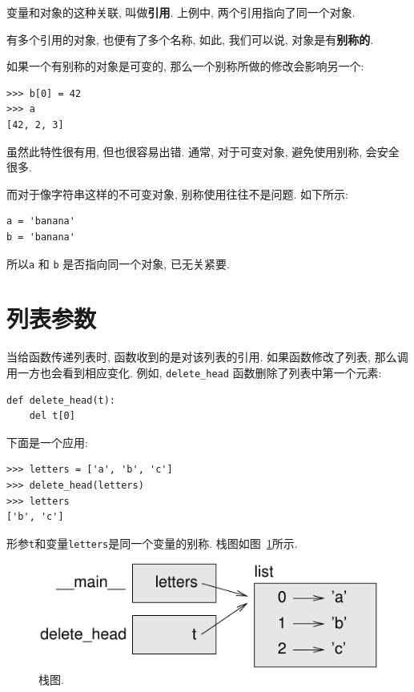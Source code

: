 \documentclass[10pt]{book}
\begin{document}
变量和对象的这种关联, 叫做{\bf 引用}.
上例中, 两个引用指向了同一个对象. 

有多个引用的对象, 也便有了多个名称, 
如此, 我们可以说, 对象是有{\bf 别称的}.

如果一个有别称的对象是可变的, 那么一个别称所做的修改会影响另一个:

\begin{verbatim}
>>> b[0] = 42
>>> a
[42, 2, 3]
\end{verbatim}
%

虽然此特性很有用, 但也很容易出错. 
通常, 对于可变对象, 避免使用别称, 会安全很多. 

而对于像字符串这样的不可变对象, 别称使用往往不是问题. 
如下所示:

\begin{verbatim}
a = 'banana'
b = 'banana'
\end{verbatim}
%
所以{\tt a} 和 {\tt b} 是否指向同一个对象, 已无关紧要. 


\section{列表参数}
\label{list.arguments}

当给函数传递列表时, 函数收到的是对该列表的引用. 
如果函数修改了列表, 那么调用一方也会看到相应变化. 
例如, \verb"delete_head" 函数删除了列表中第一个元素:

\begin{verbatim}
def delete_head(t):
    del t[0]
\end{verbatim}
%

下面是一个应用:

\begin{verbatim}
>>> letters = ['a', 'b', 'c']
>>> delete_head(letters)
>>> letters
['b', 'c']
\end{verbatim}
%
形参{\tt t}和变量{\tt letters}是同一个变量的别称. 
栈图如图~\ref{fig.stack5}所示.

\begin{figure}
\centerline
{\includegraphics[scale=0.8]{figs/stack5.pdf}}
\caption{栈图.}
\label{fig.stack5}
\end{figure}
\end{document}
